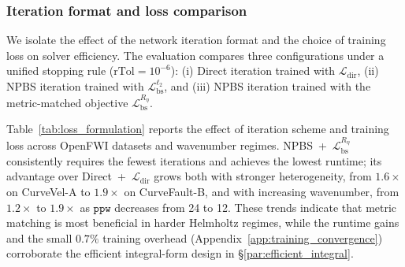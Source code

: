 \documentclass{article}
\theoremstyle{plain}
\theoremstyle{remark}
\begin{document}
\subsubsection{Iteration format and loss comparison}
We isolate the effect of the network iteration format and the choice of training loss on solver efficiency. The evaluation compares three configurations under a unified stopping rule ($\text{rTol}=10^{-6}$): (i) Direct iteration trained with $\mathcal{L}_{\mathrm{dir}}$, (ii) NPBS iteration trained with $\mathcal{L}_{\mathrm{bs}}^{\ell_2}$, and (iii) NPBS iteration trained with the metric-matched objective $\mathcal{L}_{\mathrm{bs}}^{R_\eta}$. 
\begin{table}[htbp]
\centering
\caption{Iteration format and loss comparison on OpenFWI datasets. Lower $\texttt{ppw}$ corresponds to higher wavenumber. Ratio: iteration count of NPBS+$\mathcal{L}_{\mathrm{bs}}^{R_\eta}$ vs.\ Direct+$\mathcal{L}_{\mathrm{dir}}$.}
\label{tab:loss_formulation}
\end{table}

Table~\ref{tab:loss_formulation} reports the effect of iteration scheme and training loss across OpenFWI datasets and wavenumber regimes. 
NPBS~+~$\mathcal{L}_{\mathrm{bs}}^{R_\eta}$ consistently requires the fewest iterations and achieves the lowest runtime; its advantage over Direct~+~$\mathcal{L}_{\mathrm{dir}}$ grows both with stronger heterogeneity, from $1.6\times$ on CurveVel-A to $1.9\times$ on CurveFault-B, and with increasing wavenumber, from $1.2\times$ to $1.9\times$ as $\texttt{ppw}$ decreases from 24 to 12. 
These trends indicate that metric matching is most beneficial in harder Helmholtz regimes, while the runtime gains and the small $0.7\%$ training overhead (Appendix~\ref{app:training_convergence}) corroborate the efficient integral-form design in \S\ref{par:efficient_integral}. 
\end{document}
